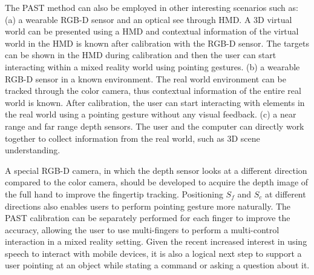 
The PAST method can also be employed in other interesting scenarios such as: (a) a wearable RGB-D sensor and an optical see through HMD. A 3D virtual world can be presented using a HMD and contextual information of the virtual world in the HMD is known after calibration with the RGB-D sensor. The targets can be shown in the HMD during calibration and then the user can start interacting within a mixed reality world using pointing gestures. 
(b) a wearable RGB-D sensor in a known environment. The real world environment can be tracked through the color camera, thus contextual information of the entire real world is known. After calibration, the user can start interacting with elements in the real world using a pointing gesture without any visual feedback.
(c) a near range and far range depth sensors. The user and the computer can directly work together to collect information from the real world, such as 3D scene understanding.

A special RGB-D camera, in which the depth sensor looks at a different direction compared to the color camera, should be developed to acquire the depth image of the full hand to improve the fingertip tracking. 
Positioning $S_f$ and $S_c$ at different directions also enables users to perform pointing gesture more naturally. 
The PAST calibration can be separately performed for each finger to improve the accuracy, allowing the user to use multi-fingers to perform a multi-control interaction in a mixed reality setting. Given the recent increased interest in using speech to interact with mobile devices, it is also a logical next step to support a user pointing at an object while stating a command or asking a question about it.

